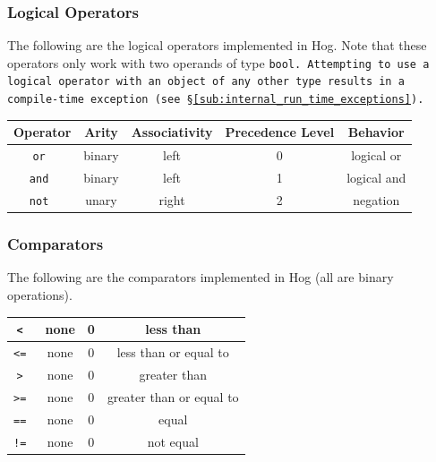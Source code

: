 \documentclass{article}
\begin{document}

\subsubsection{Logical Operators} %
\label{ssub:logical_operators}

The following are the logical operators implemented in Hog. Note that these
operators only work with two operands of type \tt bool\rm. Attempting to use a
logical operator with an object of any other type results in a compile-time
exception (see \S \ref{sub:internal_run_time_exceptions}).

\begin{center}
\begin{tabular}{|c|c|c|c|c|}

\hline \textbf{Operator} & \textbf{Arity} & \textbf{Associativity} &
\textbf{Precedence Level} & \textbf{Behavior} \\ \hline
\tt or \rm & binary & left & 0 & logical or \\ \hline
\tt and \rm & binary & left & 1 & logical and \\ \hline
\tt not \rm & unary & right & 2 & negation \\ \hline
\end{tabular}
\end{center}


\subsubsection{Comparators} %
\label{ssub:comparators}

The following are the comparators implemented in Hog (all are binary operations).

\begin{center}
\begin{tabular}{|c|c|c|c|}

\hline
\tt < \rm & none & 0 & less than \\ \hline
\tt <= \rm & none & 0 & less than or equal to \\ \hline
\tt > \rm & none & 0 & greater than \\ \hline
\tt >= \rm & none & 0 & greater than or equal to \\ \hline
\tt == \rm & none & 0 & equal \\ \hline
\tt != \rm & none & 0 & not equal \\ \hline

\end{tabular}
\end{center}
\end{document}
